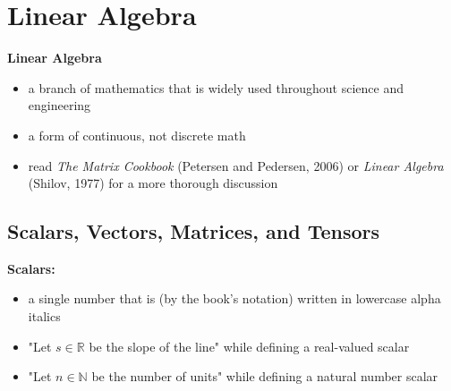 \documentclass[11pt,twocolumn]{report}
\def\realnumbers{\mathbb{R}}
\def\naturalnumbers{\mathbb{N}}
\begin{document}
\chapter{Linear Algebra}

\textbf{Linear Algebra}
\begin{itemize}
	\item a branch of mathematics that is widely used throughout science and
		engineering
	\item a form of continuous, not discrete math
	\item read \textit{The Matrix Cookbook} (Petersen and Pedersen, 2006) or
		\textit{Linear Algebra} (Shilov, 1977) for a more thorough discussion
\end{itemize}

\section{Scalars, Vectors, Matrices, and Tensors}
\large\textbf{Scalars:}
\begin{itemize}
	\item a single number that is (by the book's notation) written in lowercase
		alpha italics
	\item "Let $ s \in \realnumbers $ be the slope of the line" while defining a
		real-valued scalar
	\item "Let $ n \in \naturalnumbers $ be the number of units" while defining a natural
		number scalar
\end{itemize}
\end{document}
